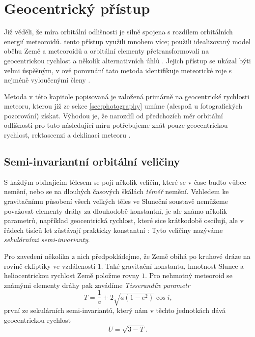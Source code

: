 \chapter{Geocentrický přístup}%
Již \citeauthor{dsh} věděli, že míra orbitální odlišnosti je silně spojena s rozdílem orbitálních energií meteoroidů. \citeauthor{newapproach} tento přístup využili mnohem více; použili idealizovaný model oběhu Země a meteoroidů a orbitální elementy přetransformovali na geocentrickou rychlost a několik alternativních úhlů \cite{newapproach}. Jejich přístup se ukázal býti velmi úspěšným, v \citeauthor{galligan}ově porovnání tato metoda identifikuje meteorické roje s nejméně vyloučenými členy \cite{galligan}.

Metoda v této kapitole popisovaná je založená primárně na geocentrické rychlosti meteoru, kterou již ze sekce \ref{sec:photography} umíme (alespoň u fotografických pozorování) získat. Výhodou je, že narozdíl od předchozích měr orbitální odlišnosti pro tuto následující míru potřebujeme znát pouze geocentrickou rychlost, rektascenzi a deklinaci meteoru \cite{newapproach}. 

\section{Semi-invariantní orbitální veličiny}%
S každým obíhajícím tělesem se pojí několik veličin, které se v čase buďto vůbec nemění, nebo se na dlouhých časových škálách \textit{téměř} nemění. Vzhledem ke gravitačnímu působení všech velkých těles ve Sluneční soustavě nemůžeme považovat elementy dráhy za dlouhodobě konstantní, je ale známo několik parametrů, například geocentrická rychlost, které sice krátkodobě oscilují, ale v řádech tisíců let zůstávají prakticky konstantní \cite{newapproach}: Tyto veličiny nazýváme \textit{sekulárními semi-invarianty}.

\medskip

Pro zavedení několika z nich předpokládejme, že Země obíhá po kruhové dráze na rovině ekliptiky ve vzdálenosti $1$. Také gravitační konstantu, hmotnost Slunce a heliocentrickou rychlost Země položme rovny $1$. Pro nehmotný meteoroid se známými elementy dráhy pak zavádíme \textit{Tisserandův parametr} \cite{newapproach}
\begin{equation}
    T=\frac{1}{a}+2\sqrt{a(1-e^2)}\cos{i} \text{,}
\end{equation}
první ze sekulárních semi-invariantů, který nám v těchto jednotkách dává geocentrickou rychlost \cite{newapproach}
\begin{equation}
    U=\sqrt{3-T}\text{.}
\end{equation}

